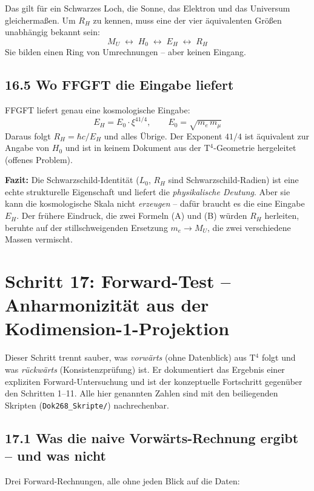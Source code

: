 Das gilt für ein Schwarzes Loch, die Sonne, das Elektron und das
Universum gleichermaßen. Um $R_H$ zu kennen, muss eine der vier
äquivalenten Größen unabhängig bekannt sein:
\[
  M_U \;\longleftrightarrow\; H_0 \;\longleftrightarrow\;
  E_H \;\longleftrightarrow\; R_H
\]
Sie bilden einen Ring von Umrechnungen -- aber keinen Eingang.

\subsection*{16.5 Wo FFGFT die Eingabe liefert}

FFGFT liefert genau eine kosmologische Eingabe:
\[
  E_H = E_0\cdot\xi^{41/4}, \qquad E_0 = \sqrt{m_e\,m_\mu}
\]
Daraus folgt $R_H = \hbar c/E_H$ und alles Übrige. Der Exponent
$41/4$ ist äquivalent zur Angabe von $H_0$ und ist in keinem
Dokument aus der T$^4$-Geometrie hergeleitet (offenes Problem).

\textbf{Fazit:} Die Schwarzschild-Identität ($L_0$, $R_H$ sind
Schwarzschild-Radien) ist eine echte strukturelle Eigenschaft und
liefert die \emph{physikalische Deutung}. Aber sie kann die
kosmologische Skala nicht \emph{erzeugen} -- dafür braucht es die
eine Eingabe $E_H$. Der frühere Eindruck, die zwei Formeln (A) und (B)
würden $R_H$ herleiten, beruhte auf der stillschweigenden Ersetzung
$m_e \to M_U$, die zwei verschiedene Massen vermischt.

\section{Schritt 17: Forward-Test -- Anharmonizität aus der Kodimension-1-Projektion}

Dieser Schritt trennt sauber, was \emph{vorwärts} (ohne Datenblick) aus
T$^4$ folgt und was \emph{rückwärts} (Konsistenzprüfung) ist. Er
dokumentiert das Ergebnis einer expliziten Forward-Untersuchung und ist
der konzeptuelle Fortschritt gegenüber den Schritten 1--11. Alle hier
genannten Zahlen sind mit den beiliegenden Skripten
(\texttt{Dok268\_Skripte/}) nachrechenbar.

\subsection*{17.1 Was die naive Vorwärts-Rechnung ergibt -- und was nicht}

Drei Forward-Rechnungen, alle ohne jeden Blick auf die Daten:


